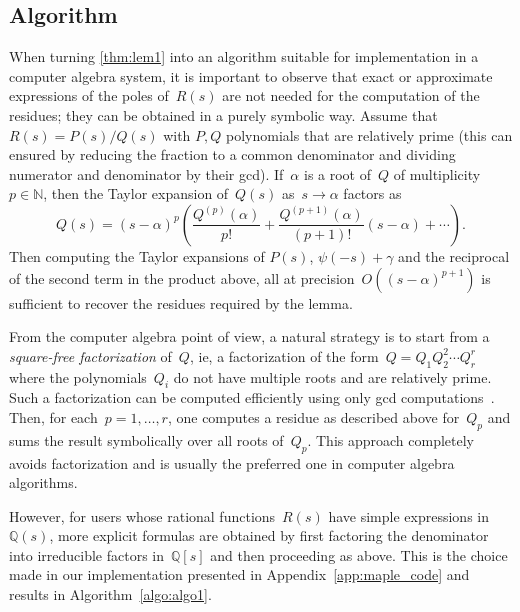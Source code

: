 \documentclass{article}
\theoremstyle{definition}
\begin{document}
\subsection{Algorithm}
When turning \cref{thm:lem1} into an algorithm suitable for implementation in a computer algebra system, it is important to observe that exact or approximate expressions of the poles of~$R(s)$ are not needed for the computation of the residues; they can be obtained in a purely symbolic way. Assume that $R(s)=P(s)/Q(s)$ with $P,Q$ polynomials that are relatively prime (this can ensured by reducing the fraction to a common denominator and dividing numerator and denominator by their gcd). If~$\alpha$ is a root of~$Q$ of multiplicity~$p\in\mathbb N$, then the Taylor expansion of~$Q(s)$ as~$s\rightarrow\alpha$ factors as
\[Q(s)=(s-\alpha)^p\left(\frac{Q^{(p)}(\alpha)}{p!} + \frac{Q^{(p+1)} (\alpha)} {(p+1)!}(s-\alpha)+\dotsb\right).\]
Then computing the Taylor expansions of $P(s)$, $\psi(-s)+\gamma$ and the reciprocal of the
second term in the product above, all at precision~$O((s-\alpha)^{p+1})$ is sufficient to recover the residues required by the lemma. 

From the computer algebra point of view, a natural strategy is to start from a \emph{square-free factorization}  of~$Q$, ie, a factorization of the form~$Q=Q_1Q_2^2\dotsm Q_r^r$ where the polynomials~$Q_i$ do not have multiple roots and are relatively prime. Such a factorization can be computed efficiently using only gcd computations~\cite[\S14.6]{GathenGerhard}. Then, for each~$p=1,\dots,r$, one computes a residue as described above for~$Q_p$ and sums the result symbolically over all roots of~$Q_p$. This approach completely avoids factorization and is usually the preferred one in computer algebra algorithms. 

However, for users whose rational functions~$R(s)$ have simple expressions in~$\mathbb Q(s)$, more explicit formulas are obtained by first factoring the denominator into irreducible factors in~$\mathbb Q[s]$ and then proceeding as above. This is the choice made in our implementation presented in Appendix~\ref{app:maple_code} and results in Algorithm~\ref{algo:algo1}.
\end{document}
